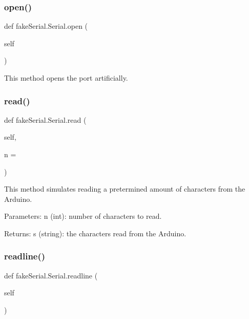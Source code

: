 \subsubsection{\texorpdfstring{open()}{open()}}
{\footnotesize\ttfamily def fake\+Serial.\+Serial.\+open (\begin{DoxyParamCaption}\item[{}]{self }\end{DoxyParamCaption})}

\begin{DoxyVerb}This method opens the port artificially.
\end{DoxyVerb}
 \mbox{\label{classfake_serial_1_1_serial_a46f1021e19572ff944e886e53a51a1d1}} 
\subsubsection{\texorpdfstring{read()}{read()}}
{\footnotesize\ttfamily def fake\+Serial.\+Serial.\+read (\begin{DoxyParamCaption}\item[{}]{self,  }\item[{}]{n = {} }\end{DoxyParamCaption})}

\begin{DoxyVerb}This method simulates reading a pretermined amount of characters from the Arduino.

Parameters:
    n (int): number of characters to read.

Returns:
    s (string): the characters read from the Arduino.
\end{DoxyVerb}
 \mbox{\label{classfake_serial_1_1_serial_a58f35303f074c25e972c0b16c6382bf4}} 
\subsubsection{\texorpdfstring{readline()}{readline()}}
{\footnotesize\ttfamily def fake\+Serial.\+Serial.\+readline (\begin{DoxyParamCaption}\item[{}]{self }\end{DoxyParamCaption})}

